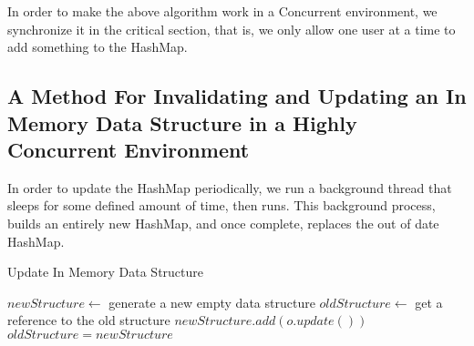 \vspace{5mm}

In order to make the above algorithm work in a Concurrent environment, we
synchronize\cite{wiki:sync} it in the critical section, that is, we only allow
one user at a time to add something to the HashMap.\\

\subsection{A Method For Invalidating and Updating an In Memory Data Structure in
a Highly Concurrent Environment}

In order to update the HashMap periodically, we run a background thread that
sleeps for some defined amount of time, then runs.  This background process,
builds an entirely new HashMap, and once complete, replaces the out of date
HashMap.\\

\begin{algorithm}[H]
  \caption { Update In Memory Data Structure }
$newStructure \leftarrow$ generate a new empty data structure\;
$oldStructure \leftarrow$ get a reference to the old structure\;
{
  $newStructure.add(o.update())$\;
}
$oldStructure = newStructure$\;
\end{algorithm}

\vspace{5mm}

